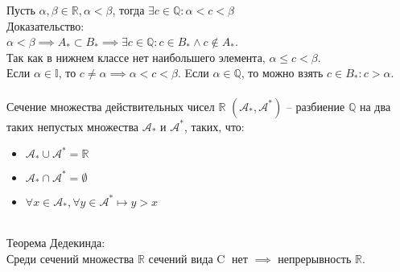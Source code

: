 \documentclass{article}
\begin{document}
        Пусть $\alpha, \beta \in \mathbb{R}, \alpha < \beta$, тогда $\exists c \in \mathbb{Q}: \alpha < c < \beta$
        \\
        Доказательство:
        \\
        $\alpha < \beta \implies A_* \subset B_* \implies \exists c \in \mathbb{Q}: c \in B_* \wedge c \notin A_*$.
        \\
        Так как в нижнем классе нет наибольшего элемента, $\alpha \le c < \beta$.
        \\
        Если $\alpha \in \mathbb{I}$, то $c \neq \alpha \implies \alpha < c < \beta$.
        Eсли $\alpha \in \mathbb{Q}$, то можно взять $c \in B_*: c > \alpha$. 
        \\
        \\
        Сечение множества действительных чисел $\mathbb{R}$ $(\mathcal{A_*}, \mathcal{A^*})$ --
        разбиение $\mathbb{Q}$ на два таких непустых множества $\mathcal{A_*}$ и $\mathcal{A^*}$, таких, что:
        \begin{itemize}
            \item $\mathcal{A_*} \cup \mathcal{A^*} = \mathbb{R}$
            \item $\mathcal{A_*} \cap \mathcal{A^*} = \emptyset$
            \item $\forall x \in \mathcal{A_*}, \forall y \in \mathcal{A^*} \longmapsto y > x$
        \end{itemize}
        \mbox{}
        \\
        Теорема Дедекинда:
        \\
        Среди сечений множества $\mathbb{R}$ сечений вида {\large \textcircled{\small C}} нет $\implies$ непрерывность $\mathbb{R}$.\
        
        
\end{document}
